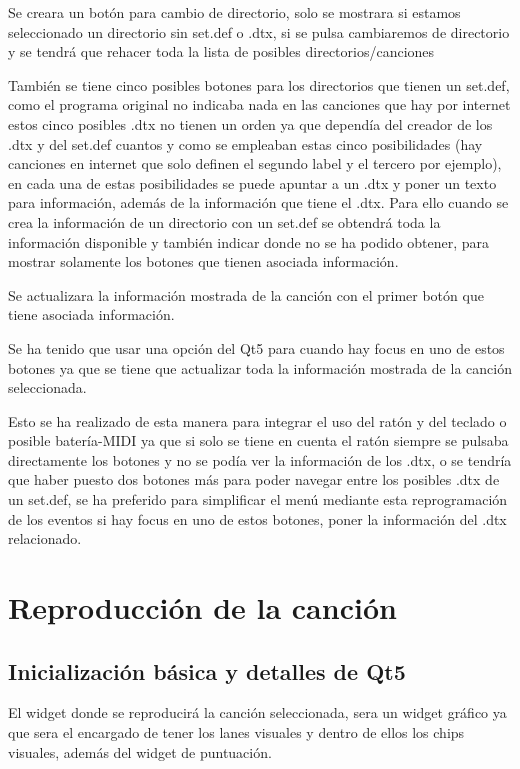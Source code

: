 \documentclass[a4paper,11pt,oneside]{book}
\begin{document}
Se creara un botón para cambio de directorio, solo se mostrara si estamos seleccionado un directorio sin set.def o .dtx, si se pulsa cambiaremos de directorio y se tendrá que rehacer toda la lista de posibles directorios/canciones

También se tiene cinco posibles botones para los directorios que tienen un set.def, como el programa original no indicaba nada en las canciones que hay por internet estos cinco posibles .dtx no tienen un orden ya que dependía del creador de los .dtx y del set.def cuantos y como se empleaban estas cinco posibilidades (hay canciones en internet que solo definen el segundo label y el tercero por ejemplo), en cada una de estas posibilidades se puede apuntar a un .dtx y poner un texto para información, además de la información que tiene el .dtx.
Para ello cuando se crea la información de un directorio con un set.def se obtendrá toda la información disponible y también indicar donde no se ha  podido obtener, para mostrar solamente los botones que tienen asociada información.

Se actualizara la información mostrada de la canción con el primer botón que tiene asociada información.
 
Se ha tenido que usar una opción del Qt5 para cuando hay focus en uno de estos botones ya que se tiene que actualizar toda la información mostrada de la canción seleccionada.

Esto se ha realizado de esta manera para integrar el uso del ratón y del teclado o posible batería-MIDI ya que si solo se tiene en cuenta el ratón siempre se pulsaba directamente los botones y no se podía ver la información de los .dtx, o se tendría que haber puesto dos botones más para poder navegar entre los posibles .dtx de un set.def, se ha preferido para simplificar el menú mediante esta reprogramación de los eventos si hay focus en uno de estos botones, poner la información del .dtx relacionado.

\section{Reproducción de la canción}

\subsection{Inicialización básica y detalles de Qt5}
El widget donde se reproducirá la canción seleccionada, sera un widget gráfico ya que sera el encargado de tener los lanes visuales y dentro de ellos los chips visuales, además del widget de puntuación.
\end{document}
